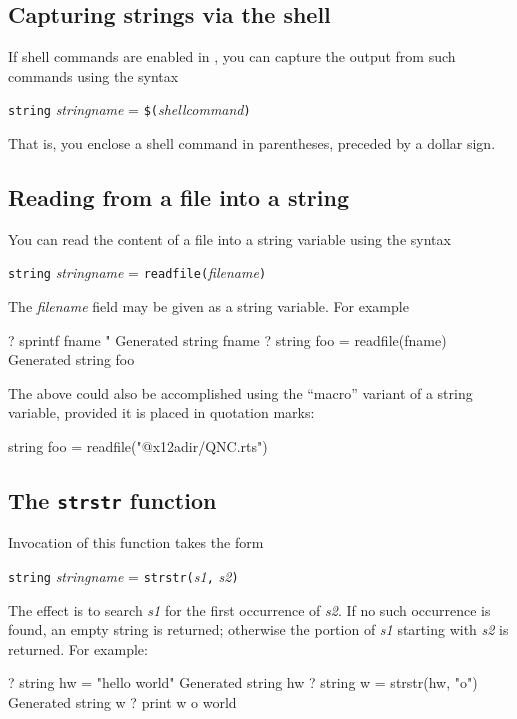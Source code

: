 \subsection{Capturing strings via the shell}

If shell commands are enabled in , you can capture the
output from such commands using the syntax 

\texttt{string} \textsl{stringname} = \texttt{\$(}\textsl{shellcommand}\texttt{)}

That is, you enclose a shell command in parentheses, preceded by
a dollar sign.

\subsection{Reading from a file into a string}

You can read the content of a file into a string variable using
the syntax

\texttt{string} \textsl{stringname} = \texttt{readfile(}\textsl{filename}\texttt{)}

The \textsl{filename} field may be given as a string variable.  For
example
%
\begin{code}
? sprintf fname "%
Generated string fname
? string foo = readfile(fname)
Generated string foo
\end{code}
%
The above could also be accomplished using the ``macro'' variant
of a string variable, provided it is placed in quotation marks: 
%
\begin{code}
string foo = readfile("@x12adir/QNC.rts")
\end{code}

\subsection{The \texttt{strstr} function}

Invocation of this function takes the form

\texttt{string} \textsl{stringname} = 
\texttt{strstr(}\textsl{s1}\texttt{,} \textsl{s2}\texttt{)}

The effect is to search \textsl{s1} for the first occurrence of
\textsl{s2}.  If no such occurrence is found, an empty string is
returned; otherwise the portion of \textsl{s1} starting with
\textsl{s2} is returned.  For example:
%
\begin{code}
? string hw = "hello world"
Generated string hw
? string w = strstr(hw, "o")
Generated string w
? print w
o world
\end{code}
%


    

